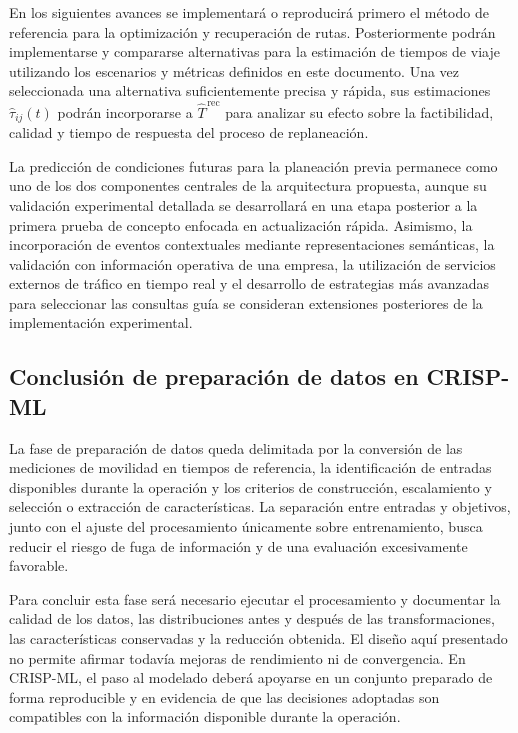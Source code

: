 \documentclass[11pt]{article}
\begin{document}
En los siguientes avances se implementará o reproducirá primero el método de
referencia para la optimización y recuperación de rutas. Posteriormente podrán
implementarse y compararse alternativas para la estimación de tiempos de viaje
utilizando los escenarios y métricas definidos en este documento. Una vez
seleccionada una alternativa suficientemente precisa y rápida, sus estimaciones
\(\widehat{\tau}_{ij}(t)\) podrán incorporarse a
\(\widehat{T}^{\,\mathrm{rec}}\) para analizar su efecto sobre la factibilidad,
calidad y tiempo de respuesta del proceso de replaneación.

La predicción de condiciones futuras para la planeación previa permanece como
uno de los dos componentes centrales de la arquitectura propuesta, aunque su
validación experimental detallada se desarrollará en una etapa posterior a la
primera prueba de concepto enfocada en actualización rápida. Asimismo, la
incorporación de eventos contextuales mediante representaciones semánticas, la
validación con información operativa de una empresa, la utilización de
servicios externos de tráfico en tiempo real y el desarrollo de estrategias
más avanzadas para seleccionar las consultas guía se consideran extensiones
posteriores de la implementación experimental.

\subsection{Conclusión de preparación de datos en CRISP-ML}

La fase de preparación de datos queda delimitada por la conversión de las
mediciones de movilidad en tiempos de referencia, la identificación de
entradas disponibles durante la operación y los criterios de construcción,
escalamiento y selección o extracción de características. La separación
entre entradas y objetivos, junto con el ajuste del procesamiento únicamente
sobre entrenamiento, busca reducir el riesgo de fuga de información y de
una evaluación excesivamente favorable.

Para concluir esta fase será necesario ejecutar el procesamiento y documentar
la calidad de los datos, las distribuciones antes y después de las
transformaciones, las características conservadas y la reducción obtenida.
El diseño aquí presentado no permite afirmar todavía mejoras de rendimiento
ni de convergencia. En CRISP-ML, el paso al modelado deberá apoyarse en un
conjunto preparado de forma reproducible y en evidencia de que las decisiones
adoptadas son compatibles con la información disponible durante la operación.
\end{document}
